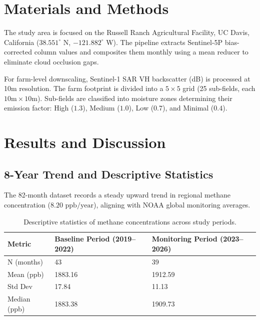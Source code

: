 \documentclass[sn-mathphys,Numbered]{sn-jnl}
\begin{document}
\section{Materials and Methods}\label{sec:methods}
The study area is focused on the Russell Ranch Agricultural Facility, UC Davis, California ($38.551^\circ$ N, $-121.882^\circ$ W). The pipeline extracts Sentinel-5P bias-corrected column values and composites them monthly using a mean reducer to eliminate cloud occlusion gaps. 

For farm-level downscaling, Sentinel-1 SAR VH backscatter (dB) is processed at 10m resolution. The farm footprint is divided into a $5\times5$ grid (25 sub-fields, each $10\text{m} \times 10\text{m}$). Sub-fields are classified into moisture zones determining their emission factor: High ($1.3$), Medium ($1.0$), Low ($0.7$), and Minimal ($0.4$).

\section{Results and Discussion}\label{sec:results}

\subsection{8-Year Trend and Descriptive Statistics}
The 82-month dataset records a steady upward trend in regional methane concentration ($8.20\text{~ppb/year}$), aligning with NOAA global monitoring averages. 

\begin{table}[h]
\begin{center}
\caption{Descriptive statistics of methane concentrations across study periods.}\label{tab:desc_stats}
\begin{tabular}{@{}lll@{}}
\toprule
Metric & Baseline Period (2019--2022) & Monitoring Period (2023--2026) \\
\midrule
N (months) & 43 & 39 \\
Mean (ppb) & 1883.16 & 1912.59 \\
Std Dev & 17.84 & 11.13 \\
Median (ppb) & 1883.38 & 1909.73 \\
\bottomrule
\end{tabular}
\end{center}
\end{table}
\end{document}

